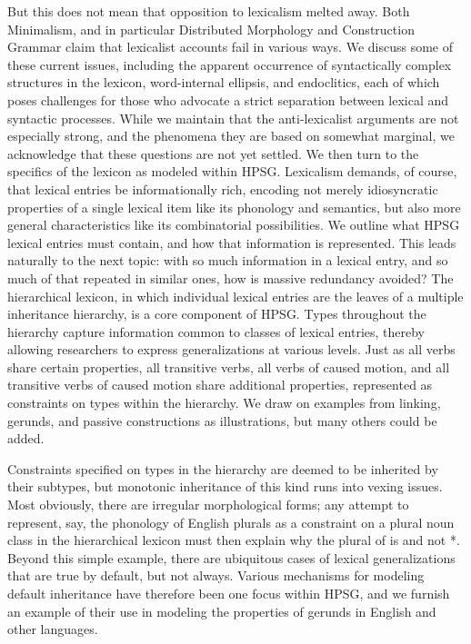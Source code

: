 \documentclass[output=paper
                ,modfonts
                ,nonflat
	        ,collection
	        ,collectionchapter
	        ,collectiontoclongg
 	        ,biblatex
                ,babelshorthands
                ,newtxmath
                ,draftmode
                ,colorlinks, citecolor=brown
]{./langsci/langscibook}
\begin{document}
{But this does not mean that opposition to lexicalism melted away.  Both Minimalism, and in particular Distributed Morphology \citep{Bruening2018, Marantz1997} and Construction Grammar \citep{Goldberg1995,Tomasello2003,vanTrijp2011} claim that lexicalist accounts fail in various ways.  We discuss some of these current issues, including the apparent occurrence of syntactically complex structures in the lexicon, word-internal ellipsis,  and endoclitics, each of which poses challenges for those who advocate a strict separation between lexical and syntactic processes.  While we maintain that the anti-lexicalist arguments are not especially strong, and the phenomena they are based on somewhat marginal, we acknowledge that these questions are not yet settled. We then turn to the specifics of the lexicon as modeled within HPSG.  Lexicalism demands, of course, that lexical entries be informationally rich, encoding not merely idiosyncratic properties of a single lexical item like its phonology and semantics, but also more general characteristics like its combinatorial possibilities.  We outline what HPSG lexical entries must contain, and how that information is represented.  This leads naturally to the next topic: with so much information in a lexical entry, and so much of that repeated in similar ones, how is massive redundancy avoided?  The hierarchical lexicon, in which individual lexical entries are the leaves of a multiple inheritance hierarchy, is a core component of HPSG.  Types throughout the hierarchy capture information common to classes of lexical entries, thereby allowing researchers to express generalizations at various levels.  Just as all verbs share certain properties, all transitive verbs, all verbs of caused motion, and all transitive verbs of caused motion share additional properties, represented as constraints on types within the hierarchy.  We draw on examples from linking, gerunds, and passive constructions as illustrations, but many others could be added.

Constraints specified on types in the hierarchy are deemed to be inherited by their subtypes, but monotonic inheritance of this kind runs into vexing issues.  Most obviously, there are irregular morphological forms; any attempt to represent, say, the phonology of English plurals as a constraint on a plural noun class in the hierarchical lexicon must then explain why the plural of  is  and not *.  Beyond this simple example, there are ubiquitous cases of lexical generalizations that are true by default, but not always.  Various mechanisms for modeling default inheritance have therefore been one focus within HPSG, and we furnish an example of their use in modeling the properties of gerunds in English and other languages.

}
\end{document}
